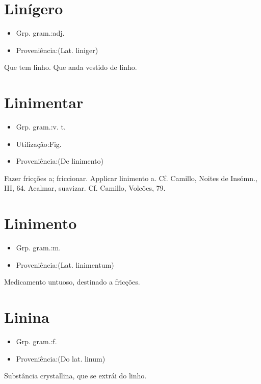 \section{Linígero}
\begin{itemize}
\item {Grp. gram.:adj.}
\end{itemize}
\begin{itemize}
\item {Proveniência:(Lat. \textunderscore liniger\textunderscore )}
\end{itemize}
Que tem linho.
Que anda vestido de linho.
\section{Linimentar}
\begin{itemize}
\item {Grp. gram.:v. t.}
\end{itemize}
\begin{itemize}
\item {Utilização:Fig.}
\end{itemize}
\begin{itemize}
\item {Proveniência:(De \textunderscore linimento\textunderscore )}
\end{itemize}
Fazer fricções a; friccionar.
Applicar linimento a. Cf. Camillo, \textunderscore Noites de Insómn.\textunderscore , III, 64.
Acalmar, suavizar. Cf. Camillo, \textunderscore Volcões\textunderscore , 79.
\section{Linimento}
\begin{itemize}
\item {Grp. gram.:m.}
\end{itemize}
\begin{itemize}
\item {Proveniência:(Lat. \textunderscore linimentum\textunderscore )}
\end{itemize}
Medicamento untuoso, destinado a fricções.
\section{Linina}
\begin{itemize}
\item {Grp. gram.:f.}
\end{itemize}
\begin{itemize}
\item {Proveniência:(Do lat. \textunderscore linum\textunderscore )}
\end{itemize}
Substância crystallina, que se extrái do linho.
